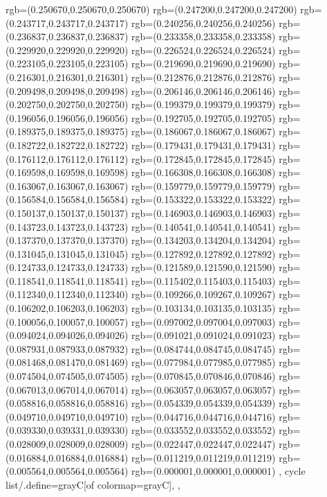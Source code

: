 {{{			rgb=(0.250670,0.250670,0.250670)
			rgb=(0.247200,0.247200,0.247200)
			rgb=(0.243717,0.243717,0.243717)
			rgb=(0.240256,0.240256,0.240256)
			rgb=(0.236837,0.236837,0.236837)
			rgb=(0.233358,0.233358,0.233358)
			rgb=(0.229920,0.229920,0.229920)
			rgb=(0.226524,0.226524,0.226524)
			rgb=(0.223105,0.223105,0.223105)
			rgb=(0.219690,0.219690,0.219690)
			rgb=(0.216301,0.216301,0.216301)
			rgb=(0.212876,0.212876,0.212876)
			rgb=(0.209498,0.209498,0.209498)
			rgb=(0.206146,0.206146,0.206146)
			rgb=(0.202750,0.202750,0.202750)
			rgb=(0.199379,0.199379,0.199379)
			rgb=(0.196056,0.196056,0.196056)
			rgb=(0.192705,0.192705,0.192705)
			rgb=(0.189375,0.189375,0.189375)
			rgb=(0.186067,0.186067,0.186067)
			rgb=(0.182722,0.182722,0.182722)
			rgb=(0.179431,0.179431,0.179431)
			rgb=(0.176112,0.176112,0.176112)
			rgb=(0.172845,0.172845,0.172845)
			rgb=(0.169598,0.169598,0.169598)
			rgb=(0.166308,0.166308,0.166308)
			rgb=(0.163067,0.163067,0.163067)
			rgb=(0.159779,0.159779,0.159779)
			rgb=(0.156584,0.156584,0.156584)
			rgb=(0.153322,0.153322,0.153322)
			rgb=(0.150137,0.150137,0.150137)
			rgb=(0.146903,0.146903,0.146903)
			rgb=(0.143723,0.143723,0.143723)
			rgb=(0.140541,0.140541,0.140541)
			rgb=(0.137370,0.137370,0.137370)
			rgb=(0.134203,0.134204,0.134204)
			rgb=(0.131045,0.131045,0.131045)
			rgb=(0.127892,0.127892,0.127892)
			rgb=(0.124733,0.124733,0.124733)
			rgb=(0.121589,0.121590,0.121590)
			rgb=(0.118541,0.118541,0.118541)
			rgb=(0.115402,0.115403,0.115403)
			rgb=(0.112340,0.112340,0.112340)
			rgb=(0.109266,0.109267,0.109267)
			rgb=(0.106202,0.106203,0.106203)
			rgb=(0.103134,0.103135,0.103135)
			rgb=(0.100056,0.100057,0.100057)
			rgb=(0.097002,0.097004,0.097003)
			rgb=(0.094024,0.094026,0.094026)
			rgb=(0.091021,0.091024,0.091023)
			rgb=(0.087931,0.087933,0.087932)
			rgb=(0.084744,0.084745,0.084745)
			rgb=(0.081468,0.081470,0.081469)
			rgb=(0.077984,0.077985,0.077985)
			rgb=(0.074504,0.074505,0.074505)
			rgb=(0.070845,0.070846,0.070846)
			rgb=(0.067013,0.067014,0.067014)
			rgb=(0.063057,0.063057,0.063057)
			rgb=(0.058816,0.058816,0.058816)
			rgb=(0.054339,0.054339,0.054339)
			rgb=(0.049710,0.049710,0.049710)
			rgb=(0.044716,0.044716,0.044716)
			rgb=(0.039330,0.039331,0.039330)
			rgb=(0.033552,0.033552,0.033552)
			rgb=(0.028009,0.028009,0.028009)
			rgb=(0.022447,0.022447,0.022447)
			rgb=(0.016884,0.016884,0.016884)
			rgb=(0.011219,0.011219,0.011219)
			rgb=(0.005564,0.005564,0.005564)
			rgb=(0.000001,0.000001,0.000001)
		},
	cycle list/.define={grayC}{[of colormap=grayC]},
	},
}
